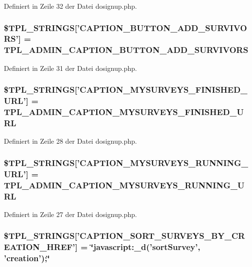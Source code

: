 Definiert in Zeile 32 der Datei dosignup.php.
\subsubsection{\setlength{\rightskip}{0pt plus 5cm}\$TPL\_\-STRINGS['CAPTION\_\-BUTTON\_\-ADD\_\-SURVIVORS'] = {\bf TPL\_\-ADMIN\_\-CAPTION\_\-BUTTON\_\-ADD\_\-SURVIVORS}}\label{dosignup_8php_d6119d6d7a684161a04ad236c3f2c9b4}




Definiert in Zeile 31 der Datei dosignup.php.
\subsubsection{\setlength{\rightskip}{0pt plus 5cm}\$TPL\_\-STRINGS['CAPTION\_\-MYSURVEYS\_\-FINISHED\_\-URL'] = {\bf TPL\_\-ADMIN\_\-CAPTION\_\-MYSURVEYS\_\-FINISHED\_\-URL}}\label{dosignup_8php_8a584c62935c7d9770244598b07c2147}




Definiert in Zeile 28 der Datei dosignup.php.
\subsubsection{\setlength{\rightskip}{0pt plus 5cm}\$TPL\_\-STRINGS['CAPTION\_\-MYSURVEYS\_\-RUNNING\_\-URL'] = {\bf TPL\_\-ADMIN\_\-CAPTION\_\-MYSURVEYS\_\-RUNNING\_\-URL}}\label{dosignup_8php_41b657c6e3910d90783d12e2fc1568eb}




Definiert in Zeile 27 der Datei dosignup.php.
\subsubsection{\setlength{\rightskip}{0pt plus 5cm}\$TPL\_\-STRINGS['CAPTION\_\-SORT\_\-SURVEYS\_\-BY\_\-CREATION\_\-HREF'] = \char`\"{}javascript:\_\-d('sortSurvey', 'creation');\char`\"{}}\label{dosignup_8php_bd2d01a122f74aecc4c96df2874be9cf}




